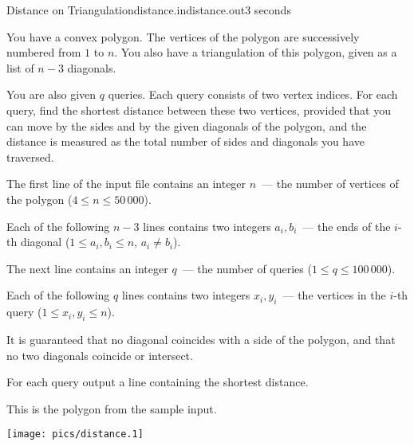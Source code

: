 \begin{problem}{Distance on Triangulation}{distance.in}{distance.out}{3 seconds}


You have a convex polygon.
The vertices of the polygon are successively numbered from $1$ to $n$.
You also have a triangulation of this polygon, given as a list of $n - 3$ diagonals.

You are also given $q$ queries. Each query consists of two vertex indices.
For each query, find the shortest distance between these two vertices, provided that you can move by the 
sides and by the given diagonals of the polygon,
and the distance is measured as the total number of sides and diagonals you have traversed.

\InputFile

The first line of the input file contains an integer
$n$~--- the number of vertices of the polygon
($4 \le n \le 50\,000$).

Each of the following $n - 3$ lines contains two integers
$a_i, b_i$~--- the ends of the $i$-th diagonal
($1 \le a_i, b_i \le n$, $a_i \neq b_i$).

The next line contains an integer
$q$~--- the number of queries
($1 \le q \le 100\,000$).

Each of the following $q$ lines contains two integers
$x_i, y_i$~--- the vertices in the $i$-th query
($1 \le x_i, y_i \le n$).

It is guaranteed that no diagonal coincides with a side of the polygon,
and that no two diagonals coincide or intersect.

\OutputFile

For each query output a line containing the shortest distance.

\Example

\begin{example}
%
\end{example}

This is the polygon from the sample input.

\begin{center}
\texttt{[image: pics/distance.1]}
\end{center}

\end{problem}
